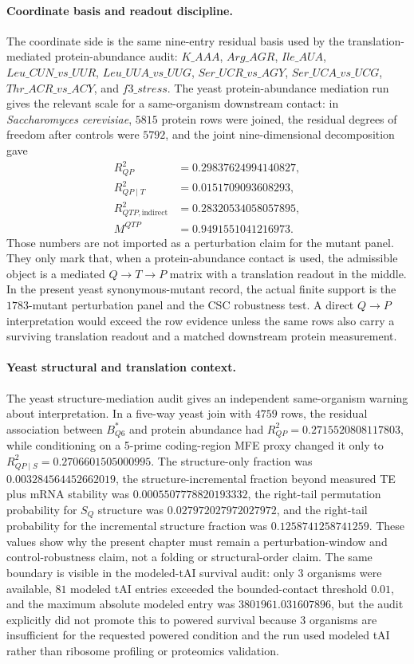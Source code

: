 \paragraph{Coordinate basis and readout discipline.}
The coordinate side is the same nine-entry residual basis used by the translation-mediated protein-abundance audit: $K\_AAA$, $Arg\_AGR$, $Ile\_AUA$, $Leu\_CUN\_vs\_UUR$, $Leu\_UUA\_vs\_UUG$, $Ser\_UCR\_vs\_AGY$, $Ser\_UCA\_vs\_UCG$, $Thr\_ACR\_vs\_ACY$, and $f3\_stress$.  The yeast protein-abundance mediation run gives the relevant scale for a same-organism downstream contact: in \textit{Saccharomyces cerevisiae}, $5815$ protein rows were joined, the residual degrees of freedom after controls were $5792$, and the joint nine-dimensional decomposition gave
$$
\begin{aligned}
  R^2_{QP} &= 0.29837624994140827,\\
  R^2_{QP\mid T} &= 0.0151709093608293,\\
  R^2_{QTP,\mathrm{indirect}} &= 0.28320534058057895,\\
  M^{QTP} &= 0.9491551041216973.
\end{aligned}
$$
Those numbers are not imported as a perturbation claim for the mutant panel.  They only mark that, when a protein-abundance contact is used, the admissible object is a mediated $Q\to T\to P$ matrix with a translation readout in the middle.  In the present yeast synonymous-mutant record, the actual finite support is the $1783$-mutant perturbation panel and the CSC robustness test.  A direct $Q\to P$ interpretation would exceed the row evidence unless the same rows also carry a surviving translation readout and a matched downstream protein measurement.

\paragraph{Yeast structural and translation context.}
The yeast structure-mediation audit gives an independent same-organism warning about interpretation.  In a five-way yeast join with $4759$ rows, the residual association between $B^{*}_{Q6}$ and protein abundance had $R^2_{QP}=0.2715520808117803$, while conditioning on a 5-prime coding-region MFE proxy changed it only to $R^2_{QP\mid S}=0.2706601505000995$.  The structure-only fraction was $0.003284564452662019$, the structure-incremental fraction beyond measured TE plus mRNA stability was $0.0005507778820193332$, the right-tail permutation probability for $S_Q$ structure was $0.027972027972027972$, and the right-tail probability for the incremental structure fraction was $0.1258741258741259$.  These values show why the present chapter must remain a perturbation-window and control-robustness claim, not a folding or structural-order claim.  The same boundary is visible in the modeled-tAI survival audit: only $3$ organisms were available, $81$ modeled tAI entries exceeded the bounded-contact threshold $0.01$, and the maximum absolute modeled entry was $3801961.031607896$, but the audit explicitly did not promote this to powered survival because $3$ organisms are insufficient for the requested powered condition and the run used modeled tAI rather than ribosome profiling or proteomics validation.

